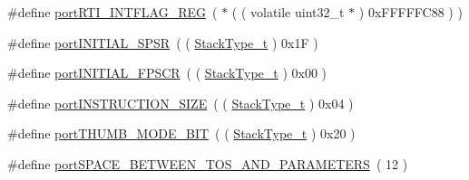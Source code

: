 \begin{DoxyCompactItemize}
\item 
\#define \hyperlink{CCS_2ARM__Cortex-R4_2port_8c_a849f31cea7f826d98176a4e075ddd3cc}{port\-R\-T\-I\-\_\-\-I\-N\-T\-F\-L\-A\-G\-\_\-\-R\-E\-G}~( $\ast$ ( ( volatile uint32\-\_\-t $\ast$ ) 0x\-F\-F\-F\-F\-F\-C88 ) )
\item 
\#define \hyperlink{CCS_2ARM__Cortex-R4_2port_8c_a153b1b0b2476d5fea865a32e6d27027d}{port\-I\-N\-I\-T\-I\-A\-L\-\_\-\-S\-P\-S\-R}~( ( \hyperlink{Flsh186_2prtmacro_8h_a84e9a8ba132feed0b2401c1f4e2ac63c}{Stack\-Type\-\_\-t} ) 0x1\-F )
\item 
\#define \hyperlink{CCS_2ARM__Cortex-R4_2port_8c_ac0d88abb68188f5d7da45c60a5f78c02}{port\-I\-N\-I\-T\-I\-A\-L\-\_\-\-F\-P\-S\-C\-R}~( ( \hyperlink{Flsh186_2prtmacro_8h_a84e9a8ba132feed0b2401c1f4e2ac63c}{Stack\-Type\-\_\-t} ) 0x00 )
\item 
\#define \hyperlink{CCS_2ARM__Cortex-R4_2port_8c_a4a09bb6297fbc0a50ed78a132ff9f0fe}{port\-I\-N\-S\-T\-R\-U\-C\-T\-I\-O\-N\-\_\-\-S\-I\-Z\-E}~( ( \hyperlink{Flsh186_2prtmacro_8h_a84e9a8ba132feed0b2401c1f4e2ac63c}{Stack\-Type\-\_\-t} ) 0x04 )
\item 
\#define \hyperlink{CCS_2ARM__Cortex-R4_2port_8c_a156ba74bc35da2293a2482ab4195183b}{port\-T\-H\-U\-M\-B\-\_\-\-M\-O\-D\-E\-\_\-\-B\-I\-T}~( ( \hyperlink{Flsh186_2prtmacro_8h_a84e9a8ba132feed0b2401c1f4e2ac63c}{Stack\-Type\-\_\-t} ) 0x20 )
\item 
\#define \hyperlink{CCS_2ARM__Cortex-R4_2port_8c_ad668c6ef52816676d05bb8f41266b8a7}{port\-S\-P\-A\-C\-E\-\_\-\-B\-E\-T\-W\-E\-E\-N\-\_\-\-T\-O\-S\-\_\-\-A\-N\-D\-\_\-\-P\-A\-R\-A\-M\-E\-T\-E\-R\-S}~( 12 )
\end{DoxyCompactItemize}

